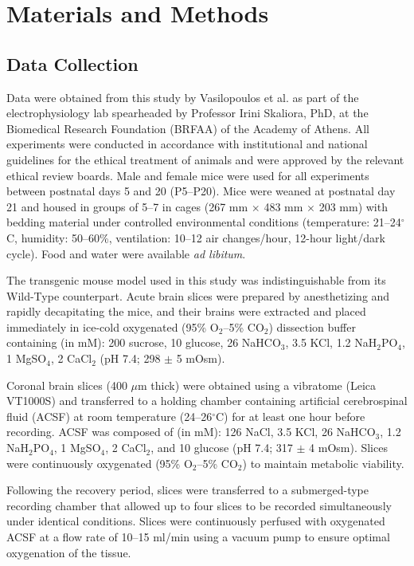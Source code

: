\documentclass{article}
\begin{document}
\section{Materials and Methods}
\subsection{Data Collection}
Data were obtained from this study \cite{vasilopoulos2023} by Vasilopoulos et al. as part of the electrophysiology lab spearheaded by Professor Irini Skaliora, PhD, at the Biomedical Research Foundation (BRFAA) of the Academy of Athens. All experiments were conducted in accordance with institutional and national guidelines for the ethical treatment of animals and were approved by the relevant ethical review boards. Male and female mice were used for all experiments between postnatal days 5 and 20 (P5--P20). Mice were weaned at postnatal day 21 and housed in groups of 5--7 in cages (267 mm $\times$ 483 mm $\times$ 203 mm) with bedding material under controlled environmental conditions (temperature: 21--24$^{\circ}$C, humidity: 50--60\%, ventilation: 10--12 air changes/hour, 12-hour light/dark cycle). Food and water were available \textit{ad libitum}.

The transgenic mouse model used in this study was indistinguishable from its Wild-Type counterpart. Acute brain slices were prepared by anesthetizing and rapidly decapitating the mice, and their brains were extracted and placed immediately in ice-cold oxygenated (95\% O$_2$--5\% CO$_2$) dissection buffer containing (in mM): 200 sucrose, 10 glucose, 26 NaHCO$_3$, 3.5 KCl, 1.2 NaH$_2$PO$_4$, 1 MgSO$_4$, 2 CaCl$_2$ (pH 7.4; 298 $\pm$ 5 mOsm).

Coronal brain slices (400 $\mu$m thick) were obtained using a vibratome (Leica VT1000S) and transferred to a holding chamber containing artificial cerebrospinal fluid (ACSF) at room temperature (24--26$^{\circ}$C) for at least one hour before recording. ACSF was composed of (in mM): 126 NaCl, 3.5 KCl, 26 NaHCO$_3$, 1.2 NaH$_2$PO$_4$, 1 MgSO$_4$, 2 CaCl$_2$, and 10 glucose (pH 7.4; 317 $\pm$ 4 mOsm). Slices were continuously oxygenated (95\% O$_2$--5\% CO$_2$) to maintain metabolic viability.

Following the recovery period, slices were transferred to a submerged-type recording chamber that allowed up to four slices to be recorded simultaneously under identical conditions. Slices were continuously perfused with oxygenated ACSF at a flow rate of 10--15 ml/min using a vacuum pump to ensure optimal oxygenation of the tissue.
\end{document}
